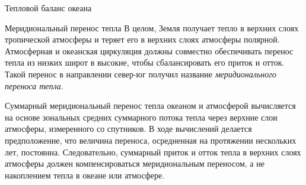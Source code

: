 \begin{chapter}{Тепловой баланс океана}
\begin{section}{Меридиональный перенос тепла}
В целом, Земля получает тепло в верхних слоях тропической атмосферы и теряет
его в верхних слоях атмосферы полярной. Атмосферная и океанская циркуляция
должны совместно обеспечивать перенос тепла из низких широт в высокие, чтобы
сбалансировать его приток и отток. Такой перенос в направлении север-юг 
получил название \emph{меридионального переноса тепла}.
%

Суммарный меридиональный перенос тепла океаном и атмосферой вычисляется на
основе зональных средних суммарного потока тепла через верхние слои атмосферы,
измеренного со спутников. В ходе вычислений делается предположение, что
величина переноса, осредненная на протяжении нескольких лет, постоянна.
Следовательно, суммарный приток и отток тепла в верхних слоях атмосферы 
должен компенсироваться меридиональным переносом, а не накоплением тепла
в океане или атмосфере.
%


\end{section}
\end{chapter}
